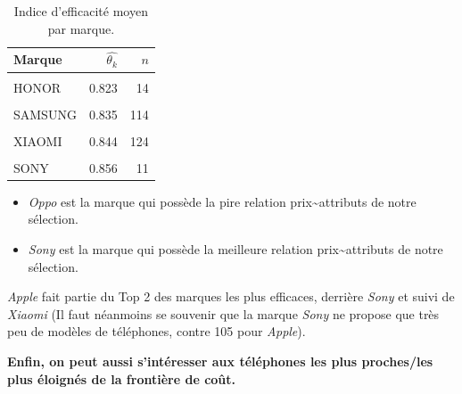 \documentclass[
  12pt,
]{report}
\providecommand{\tightlist}{%
  \setlength{\itemsep}{0pt}\setlength{\parskip}{0pt}}\usepackage{longtable,booktabs,array}
\begin{document}
\begin{table}[!h]
\centering
\caption{\label{tab:eff_brands}Indice d'efficacité moyen par marque.}
\centering
\begin{tabular}[t]{lrr}
\toprule
\textbf{Marque} & \textbf{$\hat{\theta_k}$} & \textbf{$n$}\\
\midrule
\cellcolor{gray!10}{OPPO} & \cellcolor{gray!10}{0.817} & \cellcolor{gray!10}{6}\\
HONOR & 0.823 & 14\\
\cellcolor{gray!10}{MOTOROLA} & \cellcolor{gray!10}{0.824} & \cellcolor{gray!10}{36}\\
SAMSUNG & 0.835 & 114\\
\cellcolor{gray!10}{GOOGLE} & \cellcolor{gray!10}{0.842} & \cellcolor{gray!10}{23}\\
\addlinespace
XIAOMI & 0.844 & 124\\
\cellcolor{gray!10}{APPLE} & \cellcolor{gray!10}{0.848} & \cellcolor{gray!10}{104}\\
SONY & 0.856 & 11\\
\bottomrule
\end{tabular}
\end{table}

\begin{itemize}
\tightlist
\item
  \emph{Oppo} est la marque qui possède la pire relation
  prix\textasciitilde attributs de notre sélection.
\item
  \emph{Sony} est la marque qui possède la meilleure relation
  prix\textasciitilde attributs de notre sélection.
\end{itemize}

\emph{Apple} fait partie du Top 2 des marques les plus efficaces,
derrière \emph{Sony} et suivi de \emph{Xiaomi} (Il faut néanmoins se
souvenir que la marque \emph{Sony} ne propose que très peu de modèles de
téléphones, contre 105 pour \emph{Apple}).

\textbf{Enfin, on peut aussi s'intéresser aux téléphones les plus
proches/les plus éloignés de la frontière de coût.}
\end{document}
